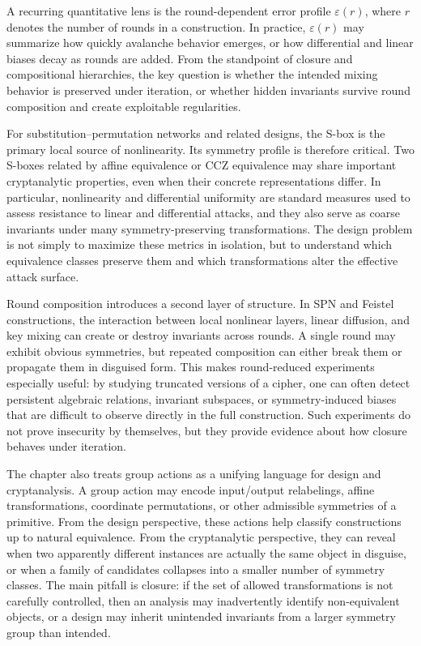 \documentclass[11pt]{article}
\begin{document}
A recurring quantitative lens is the round-dependent error profile \(\varepsilon(r)\), where \(r\) denotes the number of rounds in a construction. In practice, \(\varepsilon(r)\) may summarize how quickly avalanche behavior emerges, or how differential and linear biases decay as rounds are added. From the standpoint of closure and compositional hierarchies, the key question is whether the intended mixing behavior is preserved under iteration, or whether hidden invariants survive round composition and create exploitable regularities.

For substitution--permutation networks and related designs, the S-box is the primary local source of nonlinearity. Its symmetry profile is therefore critical. Two S-boxes related by affine equivalence or CCZ equivalence may share important cryptanalytic properties, even when their concrete representations differ. In particular, nonlinearity and differential uniformity are standard measures used to assess resistance to linear and differential attacks, and they also serve as coarse invariants under many symmetry-preserving transformations. The design problem is not simply to maximize these metrics in isolation, but to understand which equivalence classes preserve them and which transformations alter the effective attack surface.

Round composition introduces a second layer of structure. In SPN and Feistel constructions, the interaction between local nonlinear layers, linear diffusion, and key mixing can create or destroy invariants across rounds. A single round may exhibit obvious symmetries, but repeated composition can either break them or propagate them in disguised form. This makes round-reduced experiments especially useful: by studying truncated versions of a cipher, one can often detect persistent algebraic relations, invariant subspaces, or symmetry-induced biases that are difficult to observe directly in the full construction. Such experiments do not prove insecurity by themselves, but they provide evidence about how closure behaves under iteration.

The chapter also treats group actions as a unifying language for design and cryptanalysis. A group action may encode input/output relabelings, affine transformations, coordinate permutations, or other admissible symmetries of a primitive. From the design perspective, these actions help classify constructions up to natural equivalence. From the cryptanalytic perspective, they can reveal when two apparently different instances are actually the same object in disguise, or when a family of candidates collapses into a smaller number of symmetry classes. The main pitfall is closure: if the set of allowed transformations is not carefully controlled, then an analysis may inadvertently identify non-equivalent objects, or a design may inherit unintended invariants from a larger symmetry group than intended.
\end{document}
